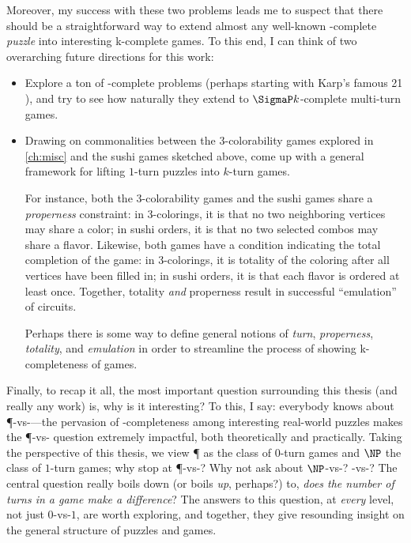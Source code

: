 Moreover, my success with these two problems leads me to suspect that there
should be a straightforward way to extend almost any well-known \NP-complete
\emph{puzzle} into interesting \SigmaP k-complete games.  To this end, I can
think of two overarching future directions for this work:
\begin{itemize}

  \item Explore a ton of \NP-complete problems (perhaps starting with Karp's
    famous 21 \parencite{karp.np}), and try to see how naturally they extend to
    \(\SigmaP k\)-complete multi-turn games.

  \item Drawing on commonalities between the 3-colorability games explored in
    \cref{ch:misc} and the sushi games sketched above, come up with a general
    framework for lifting \(1\)-turn puzzles into \(k\)-turn games.

    For instance, both the 3-colorability games and the sushi games share a
    \emph{properness} constraint: in 3-colorings, it is that no two neighboring
    vertices may share a color; in sushi orders, it is that no two selected
    combos may share a flavor.  Likewise, both games have a condition indicating
    the total completion of the game: in 3-colorings, it is totality of the
    coloring after all vertices have been filled in; in sushi orders, it is that
    each flavor is ordered at least once.  Together, totality \emph{and}
    properness result in successful ``emulation'' of circuits.

    Perhaps there is some way to define general notions of \emph{turn},
    \emph{properness}, \emph{totality}, and \emph{emulation} in order to
    streamline the process of showing \SigmaP k-completeness of games.

\end{itemize}

Finally, to recap it all, the most important question surrounding this thesis
(and really any work) is, why is it interesting?  To this, I say: everybody
knows about \P-vs-\NP—the pervasion of \NP-completeness among interesting
real-world puzzles makes the \P-vs-\NP{} question extremely impactful, both
theoretically and practically.  Taking the perspective of this thesis, we view
\P{} as the class of \(0\)-turn games and \(\NP\) the class of \(1\)-turn games;
why stop at \P-vs-\NP?  Why not ask about \(\NP\)-vs-?
-vs-?  The central question really boils down (or boils
\emph{up}, perhaps?) to, \emph{does the number of turns in a game make a
difference}?  The answers to this question, at \emph{every} level, not just
\(0\)-vs-\(1\), are worth exploring, and together, they give resounding insight
on the general structure of puzzles and games.


%
